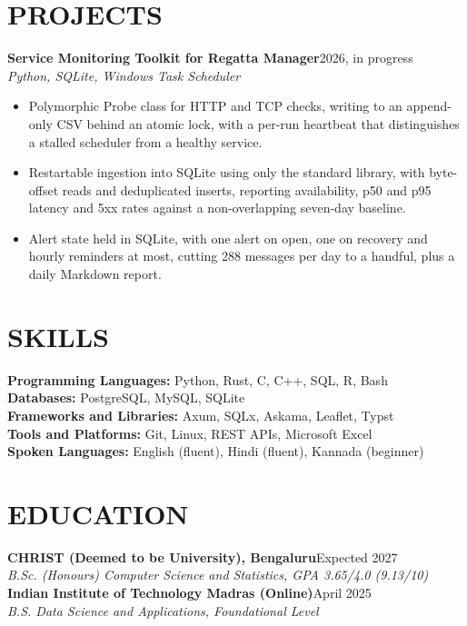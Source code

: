 \documentclass[10pt,letterpaper]{article}
\newcommand{\entry}[3]{%
  \textbf{#1}\hfill #2\\
  \textit{#3}\\[1pt]%
}
\begin{document}
\section{PROJECTS}

\entry{Service Monitoring Toolkit for Regatta Manager}{2026, in progress}
      {Python, SQLite, Windows Task Scheduler}
\begin{itemize}
  \item Polymorphic Probe class for HTTP and TCP checks, writing to an
        append-only CSV behind an atomic lock, with a per-run heartbeat that
        distinguishes a stalled scheduler from a healthy service.
  \item Restartable ingestion into SQLite using only the standard library, with
        byte-offset reads and deduplicated inserts, reporting availability, p50
        and p95 latency and 5xx rates against a non-overlapping seven-day
        baseline.
  \item Alert state held in SQLite, with one alert on open, one on recovery and
        hourly reminders at most, cutting 288 messages per day to a handful,
        plus a daily Markdown report.
\end{itemize}

\section{SKILLS}

\textbf{Programming Languages:} Python, Rust, C, C++, SQL, R, Bash\\
\textbf{Databases:} PostgreSQL, MySQL, SQLite\\
\textbf{Frameworks and Libraries:} Axum, SQLx, Askama, Leaflet, Typst\\
\textbf{Tools and Platforms:} Git, Linux, REST APIs, Microsoft Excel\\
\textbf{Spoken Languages:} English (fluent), Hindi (fluent), Kannada (beginner)

\section{EDUCATION}

\entry{CHRIST (Deemed to be University), Bengaluru}{Expected 2027}
      {B.Sc. (Honours) Computer Science and Statistics, GPA 3.65/4.0 (9.13/10)}

\entry{Indian Institute of Technology Madras (Online)}{April 2025}
      {B.S. Data Science and Applications, Foundational Level}
\end{document}
